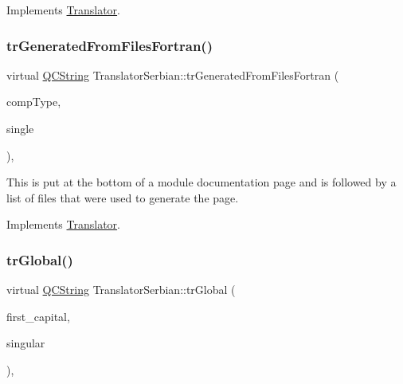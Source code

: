 Implements \mbox{\hyperlink{class_translator}{Translator}}.

\mbox{\label{class_translator_serbian_af7f6212ef2996655d61f5a91e79cf0ab}} 
\subsubsection{\texorpdfstring{trGeneratedFromFilesFortran()}{trGeneratedFromFilesFortran()}}
{\footnotesize\ttfamily virtual \mbox{\hyperlink{class_q_c_string}{Q\+C\+String}} Translator\+Serbian\+::tr\+Generated\+From\+Files\+Fortran (\begin{DoxyParamCaption}\item[{\mbox{\hyperlink{class_class_def_ae70cf86d35fe954a94c566fbcfc87939}{Class\+Def\+::\+Compound\+Type}}}]{comp\+Type,  }\item[{bool}]{single }\end{DoxyParamCaption})\hspace{0.3cm}{\ttfamily [inline]}, {\ttfamily [virtual]}}

This is put at the bottom of a module documentation page and is followed by a list of files that were used to generate the page. 

Implements \mbox{\hyperlink{class_translator}{Translator}}.

\mbox{\label{class_translator_serbian_aef389e4a14e333ec9702960d4e8d9dd0}} 
\subsubsection{\texorpdfstring{trGlobal()}{trGlobal()}}
{\footnotesize\ttfamily virtual \mbox{\hyperlink{class_q_c_string}{Q\+C\+String}} Translator\+Serbian\+::tr\+Global (\begin{DoxyParamCaption}\item[{bool}]{first\+\_\+capital,  }\item[{bool}]{singular }\end{DoxyParamCaption})\hspace{0.3cm}{\ttfamily [inline]}, {\ttfamily [virtual]}}

